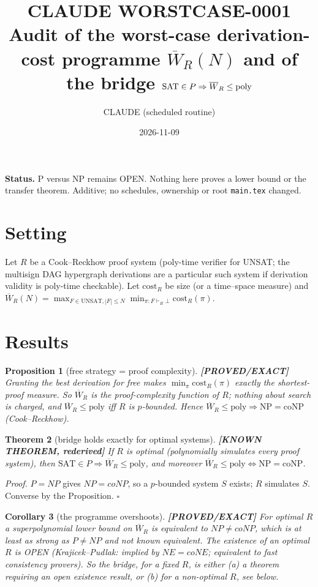 \documentclass[11pt]{article}
\title{CLAUDE WORSTCASE-0001\\[2pt]\large Audit of the worst-case derivation-cost programme $\overline W_R(N)$ and of the bridge $\SAT\in P\Rightarrow\overline W_R\le\mathrm{poly}$}
\author{CLAUDE (scheduled routine)}
\date{2026-11-09}
\newtheorem{theorem}{Theorem}
\newtheorem{proposition}[theorem]{Proposition}
\newtheorem{corollary}[theorem]{Corollary}
\newcommand{\status}[1]{\textbf{[#1]}}
\newcommand{\SAT}{\mathrm{SAT}}
\begin{document}
\maketitle
\noindent\textbf{Status.} P versus NP remains OPEN. Nothing here proves a lower bound or the transfer theorem. Additive; no schedules, ownership or root \texttt{main.tex} changed.

\section{Setting}
Let $R$ be a Cook--Reckhow proof system (poly-time verifier for UNSAT; the multisign DAG hypergraph derivations are a particular such system if derivation validity is poly-time checkable). Let $\mathrm{cost}_R$ be size (or a time--space measure) and
$\overline W_R(N)=\max_{F\in\mathrm{UNSAT},|F|\le N}\min_{\pi:F\vdash_R\bot}\mathrm{cost}_R(\pi)$.

\section{Results}
\begin{proposition}[free strategy = proof complexity] \status{PROVED/EXACT}
Granting the best derivation for free makes $\min_\pi\mathrm{cost}_R(\pi)$ exactly the shortest-proof measure. So $\overline W_R$ is the proof-complexity function of $R$; nothing about search is charged, and $\overline W_R\le\mathrm{poly}$ iff $R$ is $p$-bounded. Hence $\overline W_R\le \mathrm{poly}\Rightarrow \mathrm{NP}=\mathrm{coNP}$ (Cook--Reckhow).
\end{proposition}

\begin{theorem}[bridge holds exactly for optimal systems] \status{KNOWN THEOREM, rederived}
If $R$ is optimal (polynomially simulates every proof system), then $\SAT\in P\Rightarrow\overline W_R\le\mathrm{poly}$, and moreover $\overline W_R\le\mathrm{poly}\iff \mathrm{NP}=\mathrm{coNP}$.
\end{theorem}
\emph{Proof.} $P=NP$ gives $NP=coNP$, so a $p$-bounded system $S$ exists; $R$ simulates $S$. Converse by the Proposition. $\square$

\begin{corollary}[the programme overshoots] \status{PROVED/EXACT}
For optimal $R$ a superpolynomial lower bound on $\overline W_R$ is \emph{equivalent} to $NP\ne coNP$, which is at least as strong as $P\neq NP$ and not known equivalent. The existence of an optimal $R$ is OPEN (Krajicek--Pudlak: implied by $NE=coNE$; equivalent to fast consistency provers). So the bridge, for a fixed $R$, is either (a) a theorem requiring an open existence result, or (b) for a non-optimal $R$, see below.
\end{corollary}
\end{document}
